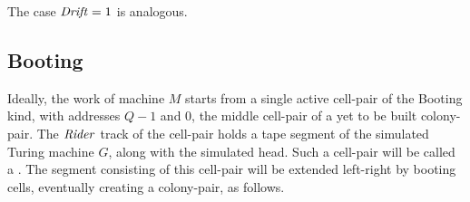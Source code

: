 \documentclass[11pt]{memoir}
\theoremstyle{definition} %
\newcommand{\fld}[1]{\ensuremath{\textit{#1\/}}}
\def\G{G} %
\newcommand{\Q}{Q} %
\newcommand{\Drift}{\fld{Drift}}
\newcommand{\Rider}{\fld{Rider}} %
\newcommand{\Member}{\mathrm{Member}}
\begin{document}
The case \( \Drift=1 \) is analogous.

\subsection{Booting}\label{sec:booting}

Ideally, the work of machine \( M \) starts from a single active cell-pair of the Booting kind,
with addresses \( \Q-1 \) and 0, the middle cell-pair of a yet to be built colony-pair.
The \( \Rider \) track of the cell-pair holds a tape segment of the simulated Turing machine \( \G \),
along with the simulated head.
Such a cell-pair will be called a .
The segment consisting of this cell-pair will be extended left-right by booting cells,
eventually creating a colony-pair, as follows.
\end{document}
